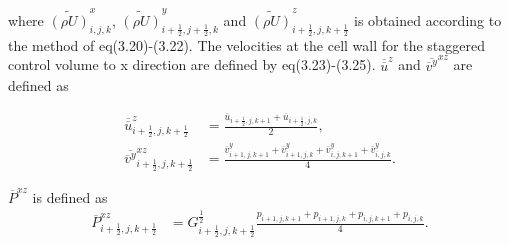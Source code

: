 where $\widetilde{(\rho U)}^x_{i,j,k}$, $\widetilde{(\rho U)}^y_{i+\frac{1}{2},j+\frac{1}{2},k}$ 
and $\widetilde{(\rho U)}^z_{i+\frac{1}{2},j,k+\frac{1}{2}}$ is obtained according to the method of eq(3.20)-(3.22).
The velocities at the cell wall for the staggered control volume to x direction are defined by eq(3.23)-(3.25).
$\overline{\overline{u}}^z$ and $\overline{\overline{v}^y}^{xz}$ are defined as

\begin{align}
 \overline{\overline{u}}^z_{i+\frac{1}{2},j,k+\frac{1}{2}}
 &= \frac{ \overline{u}_{i+\frac{1}{2},j,k+1}
         + \overline{u}_{i+\frac{1}{2},j,k  }
         } {2}, \\
 \overline{\overline{v}^y}^{xz}_{i+\frac{1}{2},j,k+\frac{1}{2}}
 &= \frac{ \overline{v}^y_{i+1,j,k+1}
         + \overline{v}^y_{i+1,j,k  }
         + \overline{v}^y_{i  ,j,k+1}
         + \overline{v}^y_{i  ,j,k  }
         } {4}.
\end{align}

$\overline{P}^{xz}$ is defined as
\begin{align}
 \overline{P}^{xz}_{i+\frac{1}{2},j,k+\frac{1}{2}}
 &=  G^{\frac{1}{2}}_{i+\frac{1}{2},j,k+\frac{1}{2}} \frac{ p_{i+1,j,k+1}
                                                          + p_{i+1,j,k  }
                                                          + p_{i  ,j,k+1}
                                                          + p_{i  ,j,k  }
                                                          } {4}.
\end{align}

